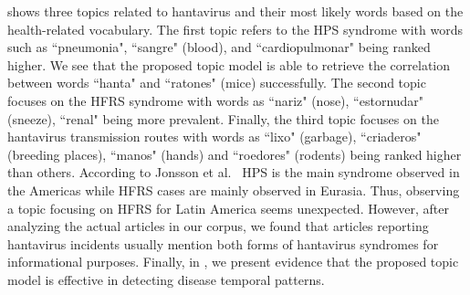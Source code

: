 \documentclass[twoside,leqno,twocolumn]{article}
\begin{document}
 shows three topics related to hantavirus and their most likely words based on the health-related vocabulary. 
The first topic refers to the HPS syndrome with words such as ``pneumonia", ``sangre" (blood), and ``cardiopulmonar" being ranked higher. We see that the proposed topic model is able to retrieve the correlation between words ``hanta" and ``ratones" (mice) successfully. The second topic focuses on the HFRS syndrome with words as  ``nariz" (nose), ``estornudar" (sneeze), ``renal" being more prevalent. Finally, the third topic focuses on the hantavirus transmission routes with words as ``lixo" (garbage), ``criaderos" (breeding places), ``manos" (hands) and ``roedores" (rodents) being ranked higher than others. According to Jonsson et al.~\cite{jonsson:10} HPS is the main syndrome observed in the Americas while HFRS cases are mainly observed in Eurasia. Thus, observing a topic focusing on HFRS for Latin America seems unexpected. However, after analyzing the actual articles in our corpus, we found that articles reporting hantavirus incidents usually mention both forms of hantavirus syndromes for informational purposes. Finally, in , we present evidence that the proposed topic model is effective in detecting disease temporal patterns.
\end{document}
